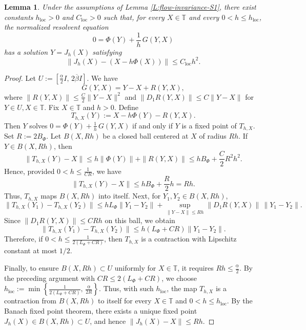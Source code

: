 \documentclass[12pt,reqno]{amsart}
\newtheorem{lemma}[theorem]{Lemma}
\begin{document}
\begin{lemma}
\label{L:uniform-local-consistency}
Under the assumptions of Lemma \ref{L:flow-invariance-S1},
there exist constants \( h_{\mathrm{loc}} > 0 \) and \( C_{\mathrm{loc}} > 0 \) such that, for every \( X \in \mathbb{T} \) and every \( 0 < h \le h_{\mathrm{loc}} \), the normalized resolvent equation
\[
0 = \Phi(Y) + \frac{1}{h} \, G(Y,X)
\]
has a solution \( Y = J_h(X) \) satisfying
\[
\| J_h(X) - (X-h\Phi(X)) \| \le C_{\mathrm{loc}}h^2.
\]
\end{lemma}

\begin{proof}
Let $U := \left[ \frac{\underline{\alpha}}{2}I, \, 2\overline{\beta}I \right]$.
%
We have
\[
G(Y,X) = Y-X + R(Y,X),
\]
where
$\| R(Y,X) \| \le \frac{C}{2} \| Y-X \|^2$ and
$\| D_1R(Y,X) \| \le C \| Y-X \|$ for
$Y \in U, X \in \mathbb{T}$.
Fix \( X \in \mathbb{T} \) and \( h > 0 \). Define
\[
T_{h,X}(Y) := X - h\Phi(Y) - R(Y,X).
\]
Then \(Y\) solves
$0 = \Phi(Y) + \frac1h \, G(Y,X)$
if and only if \(Y\) is a fixed point of \( T_{h,X} \).
Set
$R := 2 B_\Phi$.
Let \( B(X,Rh) \) be a closed ball centered at \(X\) of radius \(Rh\).
If \( Y \in B(X,Rh) \), then
\[
\| T_{h,X}(Y)-X \|
\le h \| \Phi(Y) \| + \| R(Y,X) \|
\le h B_\Phi + \frac{C}{2} R^2h^2.
\]
Hence, provided
$0 < h \le \frac{1}{CR}$,
we have
\[
\| T_{h,X}(Y) - X \|
\le hB_\Phi + \frac{R}{2}h
= Rh.
\]
Thus, \(T_{h,X}\) maps \(B(X,Rh)\) into itself.
Next, for \( Y_1,Y_2 \in B(X,Rh) \),
$$
\| T_{h,X}(Y_1) - T_{h,X}(Y_2) \|
\le h L_\Phi \| Y_1-Y_2 \| + \sup_{\| Y-X \| \le Rh} \| D_1R(Y,X) \| \, \| Y_1-Y_2 \|.
$$
Since \( \| D_1R(Y,X) \| \le CRh \) on this ball, we obtain
\[
\| T_{h,X}(Y_1) - T_{h,X}(Y_2) \|
\le h (L_\Phi + CR) \| Y_1-Y_2 \|.
\]
Therefore, if
$0 < h \le \frac{1}{2(L_\Phi + CR)}$,
then \(T_{h,X}\) is a contraction with Lipschitz constant at most \(1/2\).

Finally, to ensure \( B(X,Rh) \subset U \) uniformly for \( X \in \mathbb{T} \), it requires $Rh \le \frac{\underline{\alpha}}{2}$.
By the preceding argument with $CR \leq 2(L_\Phi + CR)$, we choose
$h_{\mathrm{loc}}
:=
\min \left\{ \frac{1}{2(L_\Phi + CR)}, \, \frac{\underline{\alpha}}{2R} \right\}$.
Thus, with such $h_{\mathrm{loc}}$,
the map \(T_{h,X}\) is a contraction from \(B(X,Rh)\) to itself for every \( X \in \mathbb{T} \) and \( 0 < h \le h_{\mathrm{loc}} \).
By the Banach fixed point theorem, there exists a unique
fixed point \( J_h(X) \in B(X,Rh) \subset U \), and hence
$\| J_h(X) - X \| \le Rh$.


\end{proof}
\end{document}
